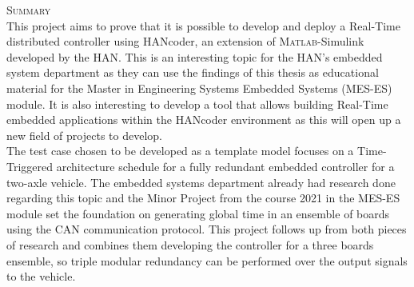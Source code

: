 \documentclass[table,xcdraw]{article}
\begin{document}


\newpage


{\Large\textsc{Summary}}\\






This project aims to prove that it is possible to develop and deploy a Real-Time distributed controller using HANcoder, an extension of \textsc{Matlab}-Simulink developed by the HAN. This is an interesting topic for the HAN's embedded system department as they can use the findings of this thesis as educational material for the Master in Engineering Systems Embedded Systems (MES-ES) module. It is also interesting to develop a tool that allows building Real-Time embedded applications within the HANcoder environment as this will open up a new field of projects to develop.\\

The test case chosen to be developed as a template model focuses on a Time-Triggered architecture schedule for a fully redundant embedded controller for a two-axle vehicle. The embedded systems department already had research done regarding this topic and the Minor Project from the course 2021 in the MES-ES module set the foundation on generating global time in an ensemble of boards using the CAN communication protocol. This project follows up from both pieces of research and combines them developing the controller for a three boards ensemble, so triple modular redundancy can be performed over the output signals to the vehicle.\\
\end{document}
